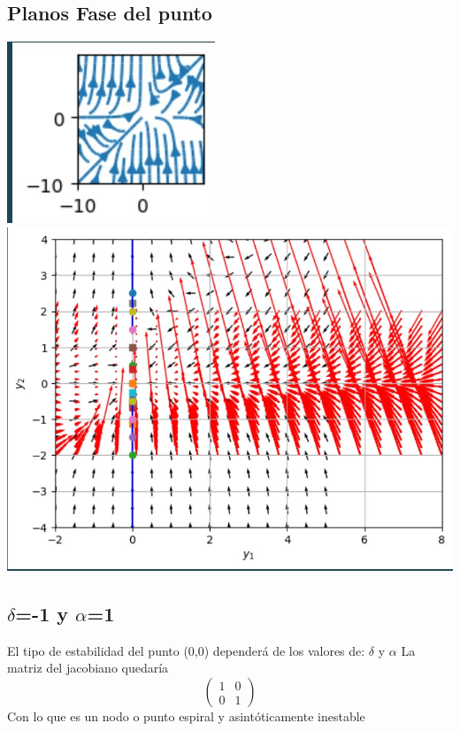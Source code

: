 \documentclass{article}
\begin{document}
          \subsection*{Planos Fase del punto }
          \noindent
          \includegraphics{Isoclinas de a=-1 y d=1.jpg}
           \includegraphics{Campo Vectoraal para a=-1 y d=1.jpg}\\
           
      \subsection*{$\delta$=-1 y $\alpha$=1}
        El tipo de estabilidad del punto (0,0) dependerá de los valores de: $\delta$ y $\alpha$
        La matriz del jacobiano quedaría
        \[
         \left(
         \begin{array}{lc}
           1 & 0\\
           0 & 1
         \end{array}
         \right)
         \]         
         Con lo que es un nodo o punto espiral y asintóticamente inestable
\end{document}
